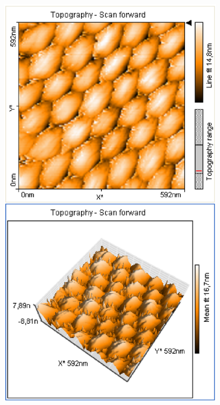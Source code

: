 \documentclass[12pt]{article}
\begin{document}
\begin{figure}[H]  
\begin{minipage}{0.4\linewidth}
\centering
\includegraphics[width=0.9\linewidth]{../plot/data/goldgitter/goldgitter3.eps}
\end{minipage}
\begin{minipage}{0.2\linewidth}
\centering
\end{minipage}
\begin{minipage}{0.4\linewidth}
\centering

\end{minipage}
\end{figure}
\end{document}
